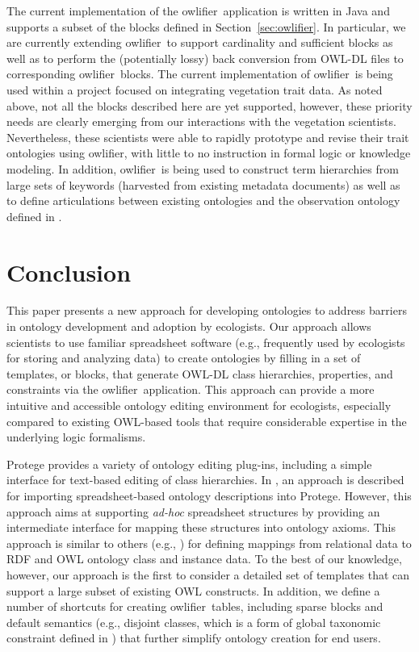 \documentclass[5p,authoryear]{elsarticle}
\newcommand{\owlifier}{\textsf{owlifier}}
\newcommand{\secref}[1]{Section~\ref{#1}}
\begin{document}
The current implementation of the \owlifier\ application is written in
Java and supports a subset of the blocks defined in
\secref{sec:owlifier}. In particular, we are currently extending
\owlifier\ to support cardinality and sufficient blocks as well as to
perform the (potentially lossy) back conversion from OWL-DL files to
corresponding \owlifier\ blocks. The current implementation of
\owlifier\ is being used within a project focused on integrating
vegetation trait data.  As noted above, not all the blocks described
here are yet supported, however, these priority needs are clearly
emerging from our interactions with the vegetation scientists.
Nevertheless, these scientists were able to rapidly prototype and
revise their trait ontologies using \owlifier, with little to no
instruction in formal logic or knowledge modeling.  In addition,
\owlifier\ is being used to construct term hierarchies from large sets
of keywords (harvested from existing metadata documents) as well as to
define articulations between existing ontologies and the observation
ontology defined in \citep{madin07:_ontol_for_descr_and_synth}.


\section{Conclusion}
\label{sec:conclusion}

This paper presents a new approach for developing ontologies to
address barriers in ontology development and adoption by
ecologists. Our approach allows scientists to use familiar spreadsheet
software (e.g., frequently used by ecologists for storing and
analyzing data) to create ontologies by filling in a set of templates,
or blocks, that generate OWL-DL class hierarchies, properties, and
constraints via the \owlifier\ application.  This approach can provide
a more intuitive and accessible ontology editing environment for
ecologists, especially compared to existing OWL-based tools that
require considerable expertise in the underlying logic formalisms.

Protege provides a variety of ontology editing plug-ins, including a
simple interface for text-based editing of class hierarchies. In
\citep{kola07:_impor_spread_data_into_proteg}, an approach is described
for importing spreadsheet-based ontology descriptions into
Protege. However, this approach aims at supporting \emph{ad-hoc}
spreadsheet structures by providing an intermediate interface for
mapping these structures into ontology axioms. This approach is
similar to others (e.g.,
\citep{han08:_rdf12,bizer03:_d2r_map,an06:_discov_seman_of_relat_tables_throug_mappin})
for defining mappings from relational data to RDF and OWL ontology
class and instance data. To the best of our knowledge, however, our
approach is the first to consider a detailed set of templates that can
support a large subset of existing OWL constructs. In addition, we
define a number of shortcuts for creating \owlifier\ tables, including
sparse blocks and default semantics (e.g., disjoint classes, which is
a form of global taxonomic constraint defined in
\citep{thau07:_reason_about_taxon_in_first_order_logi}) that further
simplify ontology creation for end users.
\end{document}
